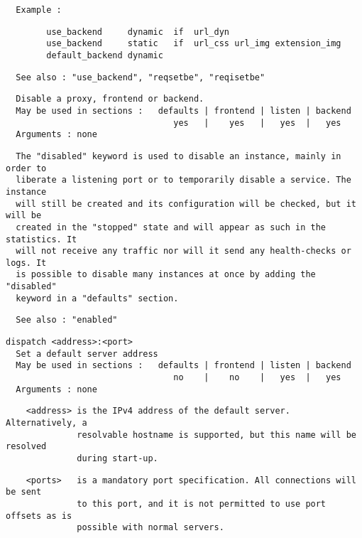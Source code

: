 \begin{verbatim}
  Example :
\end{verbatim}

\begin{verbatim}
        use_backend     dynamic  if  url_dyn
        use_backend     static   if  url_css url_img extension_img
        default_backend dynamic
\end{verbatim}

\begin{verbatim}
  See also : "use_backend", "reqsetbe", "reqisetbe"
\end{verbatim}

\begin{verbatim}
  Disable a proxy, frontend or backend.
  May be used in sections :   defaults | frontend | listen | backend
                                 yes   |    yes   |   yes  |   yes
  Arguments : none
\end{verbatim}

\begin{verbatim}
  The "disabled" keyword is used to disable an instance, mainly in order to
  liberate a listening port or to temporarily disable a service. The instance
  will still be created and its configuration will be checked, but it will be
  created in the "stopped" state and will appear as such in the statistics. It
  will not receive any traffic nor will it send any health-checks or logs. It
  is possible to disable many instances at once by adding the "disabled"
  keyword in a "defaults" section.
\end{verbatim}

\begin{verbatim}
  See also : "enabled"
\end{verbatim}

\begin{verbatim}
dispatch <address>:<port>
  Set a default server address
  May be used in sections :   defaults | frontend | listen | backend
                                 no    |    no    |   yes  |   yes
  Arguments : none
\end{verbatim}

\begin{verbatim}
    <address> is the IPv4 address of the default server. Alternatively, a
              resolvable hostname is supported, but this name will be resolved
              during start-up.
\end{verbatim}

\begin{verbatim}
    <ports>   is a mandatory port specification. All connections will be sent
              to this port, and it is not permitted to use port offsets as is
              possible with normal servers.
\end{verbatim}

